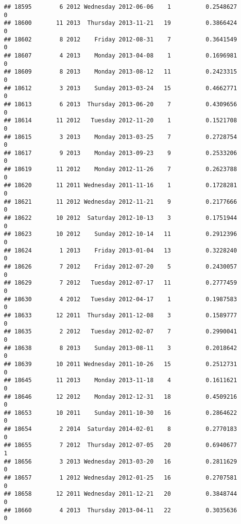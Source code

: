\documentclass[
]{article}
\begin{document}
\begin{verbatim}
## 18595        6 2012 Wednesday 2012-06-06    1          0.2548627             0
## 18600       11 2013  Thursday 2013-11-21   19          0.3866424             0
## 18602        8 2012    Friday 2012-08-31    7          0.3641549             0
## 18607        4 2013    Monday 2013-04-08    1          0.1696981             0
## 18609        8 2013    Monday 2013-08-12   11          0.2423315             0
## 18612        3 2013    Sunday 2013-03-24   15          0.4662771             0
## 18613        6 2013  Thursday 2013-06-20    7          0.4309656             0
## 18614       11 2012   Tuesday 2012-11-20    1          0.1521708             0
## 18615        3 2013    Monday 2013-03-25    7          0.2728754             0
## 18617        9 2013    Monday 2013-09-23    9          0.2533206             0
## 18619       11 2012    Monday 2012-11-26    7          0.2623788             0
## 18620       11 2011 Wednesday 2011-11-16    1          0.1728281             0
## 18621       11 2012 Wednesday 2012-11-21    9          0.2177666             0
## 18622       10 2012  Saturday 2012-10-13    3          0.1751944             0
## 18623       10 2012    Sunday 2012-10-14   11          0.2912396             0
## 18624        1 2013    Friday 2013-01-04   13          0.3228240             0
## 18626        7 2012    Friday 2012-07-20    5          0.2430057             0
## 18629        7 2012   Tuesday 2012-07-17   11          0.2777459             0
## 18630        4 2012   Tuesday 2012-04-17    1          0.1987583             0
## 18633       12 2011  Thursday 2011-12-08    3          0.1589777             0
## 18635        2 2012   Tuesday 2012-02-07    7          0.2990041             0
## 18638        8 2013    Sunday 2013-08-11    3          0.2018642             0
## 18639       10 2011 Wednesday 2011-10-26   15          0.2512731             0
## 18645       11 2013    Monday 2013-11-18    4          0.1611621             0
## 18646       12 2012    Monday 2012-12-31   18          0.4509216             0
## 18653       10 2011    Sunday 2011-10-30   16          0.2864622             0
## 18654        2 2014  Saturday 2014-02-01    8          0.2770183             0
## 18655        7 2012  Thursday 2012-07-05   20          0.6940677             1
## 18656        3 2013 Wednesday 2013-03-20   16          0.2811629             0
## 18657        1 2012 Wednesday 2012-01-25   16          0.2707581             0
## 18658       12 2011 Wednesday 2011-12-21   20          0.3848744             0
## 18660        4 2013  Thursday 2013-04-11   22          0.3035636             0

\end{verbatim}
\end{document}
